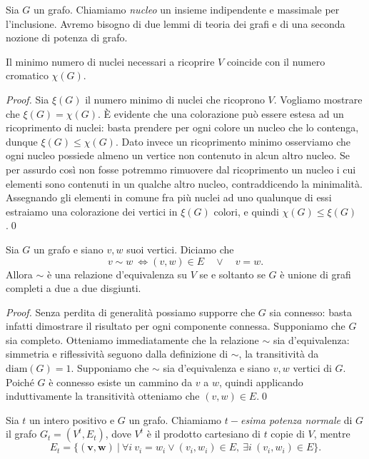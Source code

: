 Sia \(G\) un grafo. Chiamiamo \emph{nucleo} un insieme indipendente e massimale per l'inclusione. Avremo bisogno di due lemmi di teoria dei grafi e di una seconda nozione di potenza di grafo. 
\begin{lemma}
	\label{minkernellemma} Il minimo numero di nuclei necessari a ricoprire \(V\) coincide con il numero cromatico \(\chi(G)\). 
\end{lemma}
\begin{proof}
	Sia \(\xi(G)\) il numero minimo di nuclei che ricoprono \(V\). Vogliamo mostrare che \(\xi(G)=\chi(G)\). È evidente che una colorazione può essere estesa ad un ricoprimento di nuclei: basta prendere per ogni colore un nucleo che lo contenga, dunque \(\xi(G)\le \chi(G)\). Dato invece un ricoprimento minimo osserviamo che ogni nucleo possiede almeno un vertice non contenuto in alcun altro nucleo. Se per assurdo così non fosse potremmo rimuovere dal ricoprimento un nucleo i cui elementi sono contenuti in un qualche altro nucleo, contraddicendo la minimalità. Assegnando gli elementi in comune fra più nuclei ad uno qualunque di essi estraiamo una colorazione dei vertici in \(\xi(G)\) colori, e quindi \(\chi(G)\le \xi(G)\).\qed 
\end{proof}
\begin{lemma}
	\label{releqlemma} Sia \(G\) un grafo e siano \(v,w\) suoi vertici. Diciamo che
	\[v\sim w\ \iff (v,w)\in E\quad\vee\quad v=w.\]
	Allora \(\sim\) è una relazione d'equivalenza su \(V\) se e soltanto se \(G\) è unione di grafi completi a due a due disgiunti. 
\end{lemma}
\begin{proof}
	Senza perdita di generalità possiamo supporre che \(G\) sia connesso: basta infatti dimostrare il risultato per ogni componente connessa. Supponiamo che \(G\) sia completo. Otteniamo immediatamente che la relazione \(\sim\) sia d'equivalenza: simmetria e riflessività seguono dalla definizione di \(\sim\), la transitività da \(\text{diam}(G)=1\). Supponiamo che \(\sim\) sia d'equivalenza e siano \(v,w\) vertici di \(G\). Poiché \(G\) è connesso esiste un cammino da \(v\) a \(w\), quindi applicando induttivamente la transitività otteniamo che \((v,w)\in E\).\qed 
\end{proof}
\begin{definition}
	Sia \(t\) un intero positivo e \(G\) un grafo. Chiamiamo \emph{\(t-\)esima potenza normale} di \(G\) il grafo \(G_t=(V^t, E_t)\), dove \(V^t\) è il prodotto cartesiano di \(t\) copie di \(V\), mentre
	\[E_t=\{(\mathbf{v},\mathbf{w})\ \vert\ \forall i\ v_i = w_i\vee (v_i, w_i)\in E,\ \exists i\ (v_i,w_i)\in E\}.\]
\end{definition}

